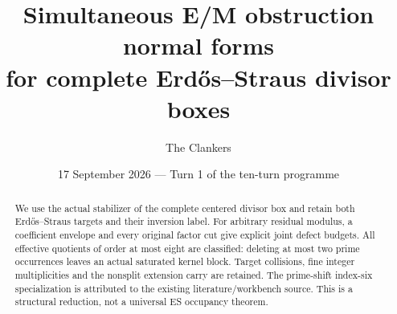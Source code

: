 \documentclass[10pt,a4paper]{article}
\title{Simultaneous E/M obstruction normal forms\\for complete Erd\H{o}s--Straus divisor boxes}
\author{The Clankers}
\date{17 September 2026 --- Turn 1 of the ten-turn programme}
\begin{document}
\maketitle
\begin{abstract}
We use the actual stabilizer of the complete centered divisor box and retain
both Erd\H{o}s--Straus targets and their inversion label. For arbitrary
residual modulus, a coefficient envelope and every original factor cut give
explicit joint defect budgets. All effective quotients of order at most eight
are classified: deleting at most two prime occurrences leaves an actual
saturated kernel block. Target collisions, fine integer multiplicities and
the nonsplit extension carry are retained. The prime-shift index-six
specialization is attributed to the existing literature/workbench source.
This is a structural reduction, not a universal ES occupancy theorem.
\end{abstract}

\clearpage
\end{document}
